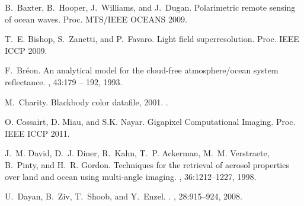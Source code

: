 \documentclass[10pt,twocolumn,letterpaper]{article}
\begin{document}
{\small
%
%

\begin{thebibliography}{10}\itemsep=-1pt

B.~Baxter, B.~Hooper, J.~Williams, and J.~Dugan.
\newblock Polarimetric remote sensing of ocean waves.
\newblock Proc. MTS/IEEE OCEANS 2009.

T.~E. Bishop, S.~Zanetti, and P.~Favaro.
\newblock Light field superresolution.
Proc. IEEE ICCP 2009.

F.~Br\'{e}on.
\newblock An analytical model for the cloud-free atmosphere/ocean system
  reflectance.
, 43:179 -- 192, 1993.


M.~Charity.
\newblock Blackbody color datafile, 2001.
.


O. Cossairt, D. Miau, and S.K. Nayar.
\newblock Gigapixel Computational Imaging.
\newblock Proc. IEEE ICCP 2011.

J.~M. David, D.~J. Diner, R.~Kahn, T.~P. Ackerman, M.~M. Verstraete, B.~Pinty,
  and H.~R. Gordon.
\newblock Techniques for the retrieval of aerosol properties over land and
  ocean using multi-angle imaging.
,
  36:1212--1227, 1998.


U.~{Dayan}, B.~{Ziv}, T.~{Shoob}, and Y.~{Enzel}.
.
, 28:915--924, 2008.


\end{thebibliography}}
\end{document}
